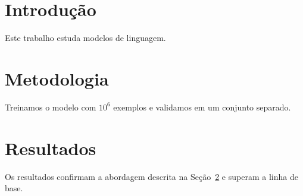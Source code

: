 \documentclass{article}
\begin{document}
\section{Introdução}\label{sec:intro}
Este trabalho estuda modelos de linguagem.

\section{Metodologia}\label{sec:metodologia}
Treinamos o modelo com $10^6$ exemplos e validamos em um conjunto separado.

\section{Resultados}
Os resultados confirmam a abordagem descrita na Seção~\ref{sec:metodologia} e superam a linha de base.
\end{document}
